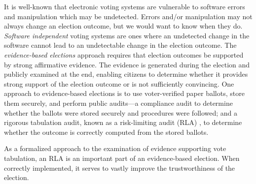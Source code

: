 It is well-known that electronic voting systems are vulnerable to software errors and manipulation which may be undetected. Errors and/or manipulation may not always change an election outcome, but we would want to know when they do. {\em Software independent} voting systems \cite{SI-Wack,rivest2008notion} are ones where an undetected change in the software cannot lead to an undetectable change in the election outcome. The {\em evidence-based elections} \cite{evidence-based} approach requires that election outcomes be supported by strong affirmative evidence. The evidence is generated during the election and publicly examined at the end, enabling citizens to determine whether it provides strong support of the election outcome or is not sufficiently convincing. 
One approach to evidence-based elections is to use voter-verified paper ballots, store them securely, and perform public audits---a compliance audit to determine whether the ballots were stored securely and procedures were followed; and a rigorous tabulation audit, known as a risk-limiting audit (RLA) \cite{RLA}, to determine whether the outcome is correctly computed from the stored ballots.  

As a formalized approach to the examination of evidence supporting vote tabulation, an RLA is an important part of an evidence-based election. When correctly implemented, it serves to vastly improve the trustworthiness of the election. 


